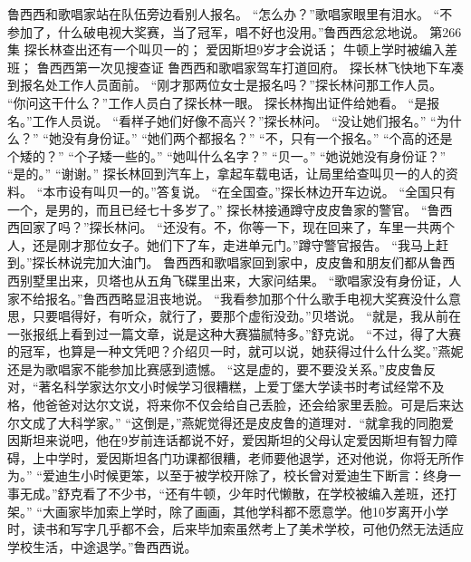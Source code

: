 \documentclass[a4paper,12pt,UTF8,twoside]{ctexbook}
\begin{document}
        鲁西西和歌唱家站在队伍旁边看别人报名。  
        “怎么办？”歌唱家眼里有泪水。  
        “不参加了，什么破电视大奖赛，当了冠军，唱不好也没用。”鲁西西忿忿地说。          第266集  
        探长林查出还有一个叫贝一的；  
        爱因斯坦9岁才会说话；  
        牛顿上学时被编入差班；  
        鲁西西第一次见搜查证    
        鲁西西和歌唱家驾车打道回府。  
        探长林飞快地下车凑到报名处工作人员面前。  
        “刚才那两位女士是报名吗？”探长林问那工作人员。  
        “你问这干什么？”工作人员白了探长林一眼。  
        探长林掏出证件给她看。  
        “是报名。”工作人员说。  
        “看样子她们好像不高兴？”探长林问。  
        “没让她们报名。”  
        “为什么？”  
        “她没有身份证。”        
        “她们两个都报名？”  
        “不，只有一个报名。”  
        “个高的还是个矮的？”  
        “个子矮一些的。”  
        “她叫什么名字？”  
        “贝一。”  
        “她说她没有身份证？”  
        “是的。”  
        “谢谢。”  
        探长林回到汽车上，拿起车载电话，让局里给查叫贝一的人的资料。  
        “本市设有叫贝一的。”答复说。  
        “在全国查。”探长林边开车边说。  
        “全国只有一个，是男的，而且已经七十多岁了。”  
        探长林接通蹲守皮皮鲁家的警官。  
        “鲁西西回家了吗？”探长林问。  
        “还没有。不，你等一下，现在回来了，车里一共两个人，还是刚才那位女子。她们下了车，走进单元门。”蹲守警官报告。  
        “我马上赶到。”探长林说完加大油门。  
        鲁西西和歌唱家回到家中，皮皮鲁和朋友们都从鲁西西别墅里出来，贝塔也从五角飞碟里出来，大家问结果。        
        “歌唱家没有身份证，人家不给报名。”鲁西西略显沮丧地说。  
        “我看参加那个什么歌手电视大奖赛没什么意思，只要唱得好，有听众，就行了，要那个虚衔没劲。”贝塔说。  
        “就是，我从前在一张报纸上看到过一篇文章，说是这种大赛猫腻特多。”舒克说。  
        “不过，得了大赛的冠军，也算是一种文凭吧？介绍贝一时，就可以说，她获得过什么什么奖。”燕妮还是为歌唱家不能参加比赛感到遗憾。  
        “这是虚的，要不要没关系。”皮皮鲁反对，“著名科学家达尔文小时候学习很糟糕，上爱丁堡大学读书时考试经常不及格，他爸爸对达尔文说，将来你不仅会给自己丢脸，还会给家里丢脸。可是后来达尔文成了大科学家。”  
        “这倒是，”燕妮觉得还是皮皮鲁的道理对．“就拿我的同胞爱因斯坦来说吧，他在9岁前连话都说不好，爱因斯坦的父母认定爱因斯坦有智力障碍，上中学时，爱因斯坦各门功课都很糟，老师要他退学，还对他说，你将无所作为。”  
        “爱迪生小时候更笨，以至于被学校开除了，校长曾对爱迪生下断言：终身一事无成。”舒克看了不少书，“还有牛顿，少年时代懒散，在学校被编入差班，还打架。”        
        “大画家毕加索上学时，除了画画，其他学科都不愿意学。他10岁离开小学时，读书和写字几乎都不会，后来毕加索虽然考上了美术学校，可他仍然无法适应学校生活，中途退学。”鲁西西说。  
\end{document}
